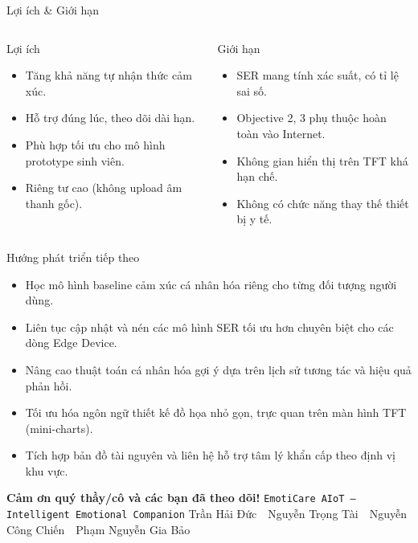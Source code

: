 \documentclass[12pt,aspectratio=169]{beamer}
\begin{document}
\begin{frame}{Lợi ích \& Giới hạn}
  \begin{columns}[T,onlytextwidth]
    \begin{block}{Lợi ích}
      \begin{itemize}\small
        \item Tăng khả năng tự nhận thức cảm xúc.
        \item Hỗ trợ đúng lúc, theo dõi dài hạn.
        \item Phù hợp tối ưu cho mô hình prototype sinh viên.
        \item Riêng tư cao (không upload âm thanh gốc).
      \end{itemize}
    \end{block}
    \begin{alertblock}{Giới hạn}
      \begin{itemize}\small
        \item SER mang tính xác suất, có tỉ lệ sai số.
        \item Objective 2, 3 phụ thuộc hoàn toàn vào Internet.
        \item Không gian hiển thị trên TFT khá hạn chế.
        \item Không có chức năng thay thế thiết bị y tế.
      \end{itemize}
    \end{alertblock}
  \end{columns}
\end{frame}

\begin{frame}{Hướng phát triển tiếp theo}
  \begin{itemize}
    \item Học mô hình baseline cảm xúc cá nhân hóa riêng cho từng đối tượng người dùng.
    \item Liên tục cập nhật và nén các mô hình SER tối ưu hơn chuyên biệt cho các dòng Edge Device.
    \item Nâng cao thuật toán cá nhân hóa gợi ý dựa trên lịch sử tương tác và hiệu quả phản hồi.
    \item Tối ưu hóa ngôn ngữ thiết kế đồ họa nhỏ gọn, trực quan trên màn hình TFT (mini-charts).
    \item Tích hợp bản đồ tài nguyên và liên hệ hỗ trợ tâm lý khẩn cấp theo định vị khu vực.
  \end{itemize}
\end{frame}

\begin{frame}[plain]
  \centering
  \vfill
  {\color{white}\Large\bfseries Cảm ơn quý thầy/cô và các bạn đã theo dõi!}
  \vskip 0.4cm
  {\color{ecAccent}\large\texttt{EmotiCare AIoT -- Intelligent Emotional Companion}}
  \vskip 1.5cm
  {\color{white!80!black}\small Trần Hải Đức \,\textbar\, Nguyễn Trọng Tài \,\textbar\, Nguyễn Công Chiến \,\textbar\, Phạm Nguyễn Gia Bảo}
  \vfill
\end{frame}
\end{document}
